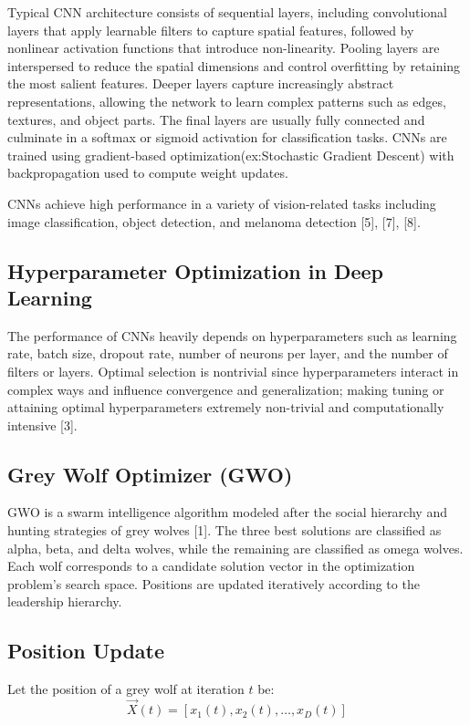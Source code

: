 \documentclass[conference]{IEEEtran}
\begin{document}
Typical CNN architecture consists of sequential layers, including convolutional layers that apply learnable filters to capture spatial features, followed by nonlinear activation functions that introduce non-linearity. Pooling layers are interspersed to reduce the spatial dimensions and control overfitting by retaining the most salient features. Deeper layers capture increasingly abstract representations, allowing the network to learn complex patterns such as edges, textures, and object parts. The final layers are usually fully connected and culminate in a softmax or sigmoid activation for classification tasks. CNNs are trained using gradient-based optimization(ex:Stochastic Gradient Descent) with backpropagation used to compute weight updates.

CNNs achieve high performance in a variety of vision-related tasks including image classification, object detection, and melanoma detection [5], [7], [8].


\subsection{Hyperparameter Optimization in Deep Learning}
The performance of CNNs heavily depends on hyperparameters such as learning rate, batch size, dropout rate, number of neurons per layer, and the number of filters or layers. Optimal selection is nontrivial since hyperparameters interact in complex ways and influence convergence and generalization; making tuning or attaining optimal hyperparameters extremely non-trivial and computationally intensive [3]. 

\subsection{Grey Wolf Optimizer (GWO)}
GWO is a swarm intelligence algorithm modeled after the social hierarchy and hunting strategies of grey wolves [1]. The three best solutions are classified as alpha, beta, and delta wolves, while the remaining are classified as omega wolves. Each wolf corresponds to a candidate solution vector in the optimization problem's search space. Positions are updated iteratively according to the leadership hierarchy. \subsection*{Position Update}

Let the position of a grey wolf at iteration $t$ be:
\[
\vec{X}(t) = [x_1(t), x_2(t), \dots, x_D(t)]
\]
\end{document}
